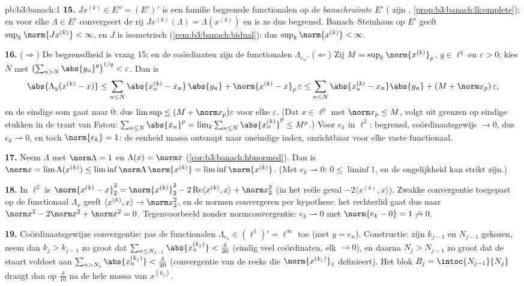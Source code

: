 \begin{solution}{pb:b3:banach:1}
\textbf{15.} $J x^{(k)} \in E'' = (E')'$ is een familie begrensde
functionalen op de \emph{banachruimte} $E'$ ( zijn
, \cref{prop:b3:banach:llcomplete}); en voor elke
$\Lambda \in E'$ convergeert de rij $Jx^{(k)}(\Lambda) =
\Lambda(x^{(k)})$ en is ze dus begrensd. Banach--Steinhaus op $E'$
geeft $\sup_k\norm{Jx^{(k)}} < \infty$, en $J$ is isometrisch
(\cref{rem:b3:banach:bidual}): dus $\sup_k\norm{x^{(k)}} <
\infty$.

\textbf{16.} ($\Rightarrow$) De begrensdheid is vraag 15; en de
coördinaten zijn de functionalen $\Lambda_{e_n}$.
($\Leftarrow$) Zij $M = \sup_k\norm{x^{(k)}}_p$, $y \in \ell^q$ en
$\varepsilon > 0$; kies $N$ met
$\bigl(\sum_{n>N}\abs{y_n}^q\bigr)^{1/q} < \varepsilon$. Dan is
\[
\abs{\Lambda_y(x^{(k)} - x)} \leq
\sum_{n\leq N}\abs{x^{(k)}_n - x_n}\,\abs{y_n} +
\norm{x^{(k)} - x}_p\,\varepsilon
\leq \sum_{n\leq N}\abs{x^{(k)}_n - x_n}\abs{y_n} +
(M + \norm x_p)\,\varepsilon,
\]
en de eindige som gaat naar $0$: dus $\limsup \leq (M + \norm
x_p)\varepsilon$ voor elke $\varepsilon$. (Dat $x \in \ell^p$ met
$\norm x_p \leq M$, volgt uit grenzen op eindige stukken in de
trant van Fatou: $\sum_{n \leq N}\abs{x_n}^p =
\lim_k\sum_{n\leq N}\abs{x^{(k)}_n}^p \leq M^p$.) Voor $e_k$ in
$\ell^2$: begrensd, coördinaatsgewijs $\to 0$, dus $e_k
\rightharpoonup 0$, en toch $\norm{e_k} = 1$: de eenheid massa
ontsnapt naar oneindige index, onzichtbaar voor elke vaste
functionaal.

\textbf{17.} Neem $\Lambda$ met $\norm\Lambda = 1$ en $\Lambda(x)
= \norm x$ (\cref{cor:b3:banach:hbnormed}). Dan is $\norm x =
\lim\Lambda(x^{(k)}) \leq \liminf\norm\Lambda\,\norm{x^{(k)}} =
\liminf\norm{x^{(k)}}$. (Met $e_k \rightharpoonup 0$: $0 \leq
\liminf 1$, en de ongelijkheid kan strikt zijn.)

\textbf{18.} In $\ell^2$ is $\norm{x^{(k)} - x}_2^2 =
\norm{x^{(k)}}_2^2 - 2\operatorname{Re}\langle x^{(k)}, x\rangle
+ \norm x_2^2$ (in het reële geval $-2\langle x^{(k)},
x\rangle$). Zwakke convergentie toegepast op de functionaal
$\Lambda_x$ geeft $\langle x^{(k)}, x\rangle \to \norm x_2^2$, en
de normen convergeren per hypothese: het rechterlid gaat dus naar
$\norm x^2 - 2\norm x^2 + \norm x^2 = 0$. Tegenvoorbeeld zonder
normconvergentie: $e_k \rightharpoonup 0$ met $\norm{e_k - 0} = 1
\not\to 0$.

\textbf{19.} Coördinaatsgewijze convergentie: pas de functionalen
$\Lambda_{e_n} \in (\ell^1)' = \ell^\infty$ toe (met $y = e_n$).
Constructie: zijn $k_{j-1}$ en $N_{j-1}$ gekozen, neem dan $k_j >
k_{j-1}$ zo groot dat $\sum_{n \leq N_{j-1}}\abs{x^{(k_j)}_n} <
\frac\delta{20}$ (eindig veel coördinaten, elk $\to 0$), en
daarna $N_j > N_{j-1}$ zo groot dat de staart voldoet aan
$\sum_{n > N_j}\abs{x^{(k_j)}_n} < \frac\delta{20}$ (convergentie
van de reeks die $\norm{x^{(k_j)}}_1$ definieert). Het blok $B_j =
\intoc{N_{j-1}}{N_j}$ draagt dan op $\frac\delta{10}$ na de hele
massa van $x^{(k_j)}$.


\end{solution}
